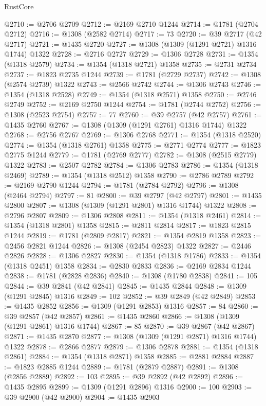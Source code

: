 \begin{lexlean}{RustCore}
\begin{coremodule}
@2710 := @2706 @2709
@2712 := @2169 @2710 @1244
@2714 := @1781 (@2704 @2712)
@2716 := @1308 (@2582 @2714)
@2717 := 73
@2720 := @39 @2717 (@42 @2717)
@2721 := @1435 @2720
@2727 := @1308 (@1309 (@1291 @2721) @1316 @1744) @1322
@2728 := @2716 @2727
@2729 := @1306 @2728
@2731 := @1354 (@1318 @2579)
@2734 := @1354 (@1318 @2721) @1358
@2735 := @2731 @2734
@2737 := @1823 @2735 @1244
@2739 := @1781 (@2729 @2737)
@2742 := @1308 (@2574 @2739) @1322
@2743 := @2566 @2742
@2744 := @1306 @2743
@2746 := @1354 (@1318 @2528)
@2749 := @1354 (@1318 @2571) @1358
@2750 := @2746 @2749
@2752 := @2169 @2750 @1244
@2754 := @1781 (@2744 @2752)
@2756 := @1308 (@2523 @2754)
@2757 := 77
@2760 := @39 @2757 (@42 @2757)
@2761 := @1435 @2760
@2767 := @1308 (@1309 (@1291 @2761) @1316 @1744) @1322
@2768 := @2756 @2767
@2769 := @1306 @2768
@2771 := @1354 (@1318 @2520)
@2774 := @1354 (@1318 @2761) @1358
@2775 := @2771 @2774
@2777 := @1823 @2775 @1244
@2779 := @1781 (@2769 @2777)
@2782 := @1308 (@2515 @2779) @1322
@2783 := @2507 @2782
@2784 := @1306 @2783
@2786 := @1354 (@1318 @2469)
@2789 := @1354 (@1318 @2512) @1358
@2790 := @2786 @2789
@2792 := @2169 @2790 @1244
@2794 := @1781 (@2784 @2792)
@2796 := @1308 (@2464 @2794)
@2797 := 81
@2800 := @39 @2797 (@42 @2797)
@2801 := @1435 @2800
@2807 := @1308 (@1309 (@1291 @2801) @1316 @1744) @1322
@2808 := @2796 @2807
@2809 := @1306 @2808
@2811 := @1354 (@1318 @2461)
@2814 := @1354 (@1318 @2801) @1358
@2815 := @2811 @2814
@2817 := @1823 @2815 @1244
@2819 := @1781 (@2809 @2817)
@2821 := @1354 @2819 @1358
@2823 := @2456 @2821 @1244
@2826 := @1308 (@2454 @2823) @1322
@2827 := @2446 @2826
@2828 := @1306 @2827
@2830 := @1354 (@1318 @1786)
@2833 := @1354 (@1318 @2451) @1358
@2834 := @2830 @2833
@2836 := @2169 @2834 @1244
@2838 := @1781 (@2828 @2836)
@2840 := @1308 (@1780 @2838)
@2841 := 105
@2844 := @39 @2841 (@42 @2841)
@2845 := @1435 @2844
@2848 := @1309 (@1291 @2845) @1316
@2849 := 102
@2852 := @39 @2849 (@42 @2849)
@2853 := @1435 @2852
@2856 := @1309 (@1291 @2853) @1316
@2857 := 84
@2860 := @39 @2857 (@42 @2857)
@2861 := @1435 @2860
@2866 := @1308 (@1309 (@1291 @2861) @1316 @1744)
@2867 := 85
@2870 := @39 @2867 (@42 @2867)
@2871 := @1435 @2870
@2877 := @1308 (@1309 (@1291 @2871) @1316 @1744) @1322
@2878 := @2866 @2877
@2879 := @1306 @2878
@2881 := @1354 (@1318 @2861)
@2884 := @1354 (@1318 @2871) @1358
@2885 := @2881 @2884
@2887 := @1823 @2885 @1244
@2889 := @1781 (@2879 @2887)
@2891 := @1308 (@2856 @2889)
@2892 := 103
@2895 := @39 @2892 (@42 @2892)
@2896 := @1435 @2895
@2899 := @1309 (@1291 @2896) @1316
@2900 := 100
@2903 := @39 @2900 (@42 @2900)
@2904 := @1435 @2903

\end{coremodule}
\end{lexlean}
